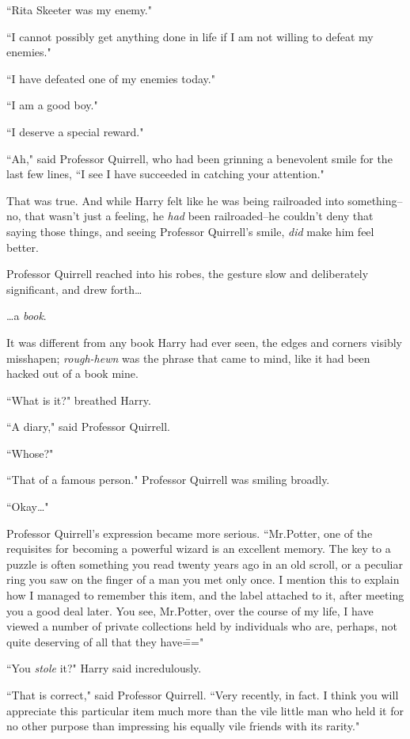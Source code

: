 ``Rita Skeeter was my enemy."

``I cannot possibly get anything done in life if I am not willing to defeat my enemies."

``I have defeated one of my enemies today."

``I am a good boy."

``I deserve a special reward."

``Ah," said Professor Quirrell, who had been grinning a benevolent smile for the last few lines, ``I see I have succeeded in catching your attention."

That was true. And while Harry felt like he was being railroaded into something\---no, that wasn't just a feeling, he \emph{had} been railroaded\---he couldn't deny that saying those things, and seeing Professor Quirrell's smile, \emph{did} make him feel better.

Professor Quirrell reached into his robes, the gesture slow and deliberately significant, and drew forth{\ldots}

{\ldots}a \emph{book}.

It was different from any book Harry had ever seen, the edges and corners visibly misshapen; \emph{rough-hewn} was the phrase that came to mind, like it had been hacked out of a book mine.

``What is it?" breathed Harry.

``A diary," said Professor Quirrell.

``Whose?"

``That of a famous person." Professor Quirrell was smiling broadly.

``Okay{\ldots}"

Professor Quirrell's expression became more serious. ``Mr.\?Potter, one of the requisites for becoming a powerful wizard is an excellent memory. The key to a puzzle is often something you read twenty years ago in an old scroll, or a peculiar ring you saw on the finger of a man you met only once. I mention this to explain how I managed to remember this item, and the label attached to it, after meeting you a good deal later. You see, Mr.\?Potter, over the course of my life, I have viewed a number of private collections held by individuals who are, perhaps, not quite deserving of all that they have\==="

``You \emph{stole} it?" Harry said incredulously.

``That is correct," said Professor Quirrell. ``Very recently, in fact. I think you will appreciate this particular item much more than the vile little man who held it for no other purpose than impressing his equally vile friends with its rarity."

